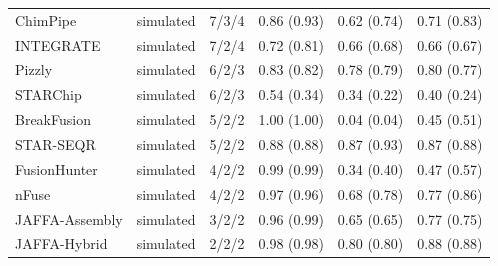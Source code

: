 {\begin{longtable}{llrlll}
ChimPipe & simulated & 7/3/4 & 0.86 (0.93) & 0.62 (0.74) & 0.71 (0.83) \\
INTEGRATE & simulated & 7/2/4 & 0.72 (0.81) & 0.66 (0.68) & 0.66 (0.67) \\
Pizzly & simulated & 6/2/3 & 0.83 (0.82) & 0.78 (0.79) & 0.80 (0.77) \\
STARChip & simulated & 6/2/3 & 0.54 (0.34) & 0.34 (0.22) & 0.40 (0.24) \\
BreakFusion & simulated & 5/2/2 & 1.00 (1.00) & 0.04 (0.04) & 0.45 (0.51) \\
STAR-SEQR & simulated & 5/2/2 & 0.88 (0.88) & 0.87 (0.93) & 0.87 (0.88) \\
FusionHunter & simulated & 4/2/2 & 0.99 (0.99) & 0.34 (0.40) & 0.47 (0.57) \\
nFuse & simulated & 4/2/2 & 0.97 (0.96) & 0.68 (0.78) & 0.77 (0.86) \\
JAFFA-Assembly & simulated & 3/2/2 & 0.96 (0.99) & 0.65 (0.65) & 0.77 (0.75) \\
JAFFA-Hybrid & simulated & 2/2/2 & 0.98 (0.98) & 0.80 (0.80) & 0.88 (0.88) \\
\bottomrule
\end{longtable}
}
